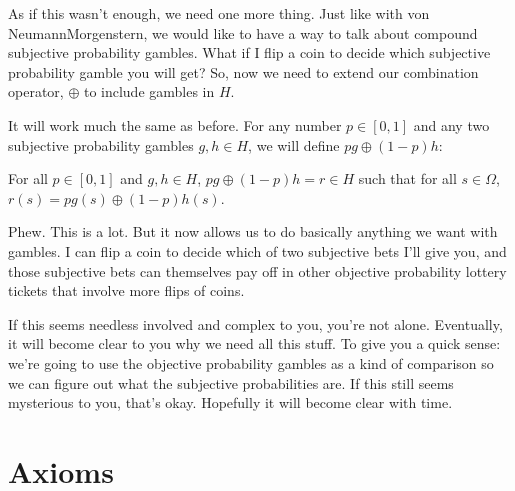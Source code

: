 
As if this wasn't enough, we need one more thing.  Just like with von Neumann\breakslash Morgenstern, we would like to have a way to talk about compound subjective probability gambles. What if I flip a coin to decide which subjective probability gamble you will get?  So, now we need to extend our combination operator, $\oplus$ to include gambles in $H$.

It will work much the same as before.  For any number $p \in [0,1]$ and any two subjective probability gambles $g, h \in H$, we will define $p g \oplus (1-p) h$:
\begin{definition}
For all $p \in [0,1]$ and $g, h \in H$, $p g \oplus (1-p) h = r \in H$ such that for all $s \in \Omega$, $r(s) = p g(s) \oplus (1-p) h(s)$.
\end{definition}

Phew.  This is a lot. But it now allows us to do basically anything we want with gambles.  I can flip a coin to decide which of two subjective bets I'll give you, and those subjective bets can themselves pay off in other objective probability lottery tickets that involve more flips of coins.  

If this seems needless involved and complex to you, you're not alone.  Eventually, it will become clear to you why we need all this stuff.  To give you a quick sense: we're going to use the objective probability gambles as a kind of comparison so we can figure out what the subjective probabilities are.  If this still seems mysterious to you, that's okay. Hopefully it will become clear with time.

\section{Axioms}


